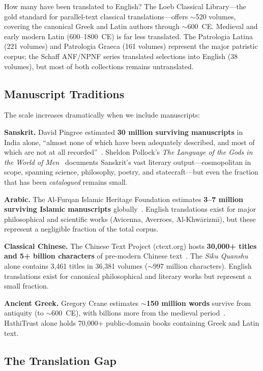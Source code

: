 \documentclass[10pt,twocolumn]{article}
\begin{document}
How many have been translated to English? The Loeb Classical Library---the gold standard for parallel-text classical translations---offers ${\sim}$520 volumes, covering the canonical Greek and Latin authors through ${\sim}$600~CE. Medieval and early modern Latin (600--1800~CE) is far less translated. The Patrologia Latina (221 volumes) and Patrologia Graeca (161 volumes) represent the major patristic corpus; the Schaff ANF/NPNF series translated selections into English (38 volumes), but most of both collections remains untranslated.

\subsection{Manuscript Traditions}

The scale increases dramatically when we include manuscripts:

\textbf{Sanskrit.} David Pingree estimated \textbf{30 million surviving manuscripts} in India alone, ``almost none of which have been adequately described, and most of which are not at all recorded''~\cite{pingree1981}. Sheldon Pollock's \emph{The Language of the Gods in the World of Men}~\cite{pollock2003} documents Sanskrit's vast literary output---cosmopolitan in scope, spanning science, philosophy, poetry, and statecraft---but even the fraction that has been \emph{catalogued} remains small.

\textbf{Arabic.} The Al-Furqan Islamic Heritage Foundation estimates \textbf{3--7 million surviving Islamic manuscripts} globally~\cite{alfurqan}. English translations exist for major philosophical and scientific works (Avicenna, Averroes, Al-Khw\=arizm\={\i}), but these represent a negligible fraction of the total corpus.

\textbf{Classical Chinese.} The Chinese Text Project (ctext.org) hosts \textbf{30,000+ titles and 5+ billion characters} of pre-modern Chinese text~\cite{ctp}. The \emph{Siku Quanshu} alone contains 3,461 titles in 36,381 volumes (${\sim}$997 million characters). English translations exist for canonical philosophical and literary works but represent a small fraction.

\textbf{Ancient Greek.} Gregory Crane estimates ${\sim}$\textbf{150 million words} survive from antiquity (to ${\sim}$600~CE), with billions more from the medieval period~\cite{crane2019}. HathiTrust alone holds 70,000+ public-domain books containing Greek and Latin text.

\subsection{The Translation Gap}
\end{document}
